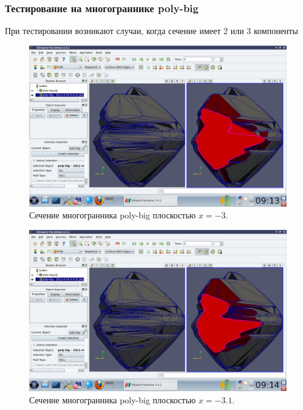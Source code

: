 \documentclass[a4paper,12pt, titlepage]{article}
\begin{document}
\subsubsection{Тестирование на многограннике poly-big}
	\begin{flushleft}
		При тестировании возникают случаи, когда сечение имеет 2 или 3 компоненты
	\end{flushleft}
	\begin{flushleft}
		\begin{figure}[h]
		    \includegraphics[trim = 220 65 10 140, clip, width=15cm]{poly-big/3.png}
		    \caption{Сечение многогранника poly-big плоскостью $x = -3$.}
		    \label{poly-big-1}
		\end{figure}
	\end{flushleft}
	\begin{flushleft}
		\begin{figure}[h]
		    \includegraphics[trim = 220 65 10 140, clip, width=15cm]{poly-big/31.png}
		    \caption{Сечение многогранника poly-big плоскостью $x = -3.1$.}
		    \label{poly-big-2}
		\end{figure}
	\end{flushleft}
\end{document}

